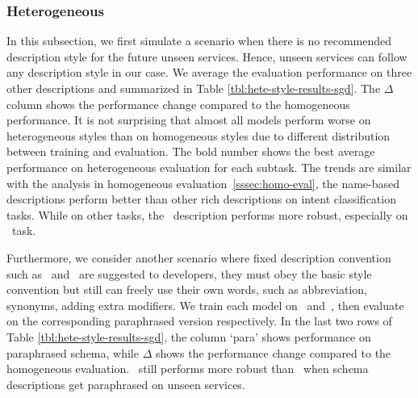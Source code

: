 \subsubsection{Heterogeneous}
\label{sssec:heter-eval}
In this subsection, we first simulate a scenario when there is no
recommended description style for the future unseen services. Hence,
unseen services can follow any description style in our case. We
average the evaluation performance on three other descriptions and
summarized in Table \ref{tbl:hete-style-results-sgd}. The $\Delta$ column
shows the performance change compared to the homogeneous
performance. It is not surprising that almost all models perform worse
on heterogeneous styles than on homogeneous styles due to different
distribution between training and evaluation. The bold number shows
the best average performance on heterogeneous evaluation for each
subtask. The trends are similar with the analysis in homogeneous
evaluation~\ref{sssec:homo-eval}, the name-based descriptions perform
better than other rich descriptions on intent classification
tasks. While on other tasks, the \ORIGIN~description performs more
robust, especially on \NSL~task.

Furthermore, we consider another scenario where fixed description
convention such as \NAMEONLY~and \ORIGIN~are suggested to developers,
they must obey the basic style convention but still can freely use
their own words, such as abbreviation, synonyms, adding extra
modifiers. We train each model on \NAMEONLY~and~\ORIGIN, then evaluate
on the corresponding paraphrased version respectively. In the last two
rows of Table \ref{tbl:hete-style-results-sgd}, the column `para'
shows performance on paraphrased schema, while $\Delta$ shows the
performance change compared to the homogeneous evaluation.
\ORIGIN~still performs more robust than \NAMEONLY~when schema
descriptions get paraphrased on unseen services.

